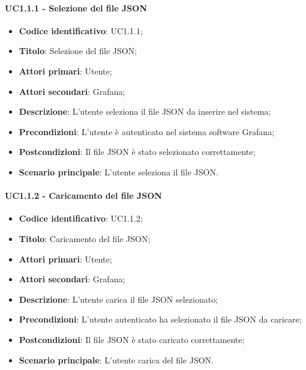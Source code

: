 \paragraph{UC1.1.1 - Selezione del file JSON}
\begin{itemize}
	\item \textbf{Codice identificativo}: UC1.1.1;
	\item \textbf{Titolo}: Selezione del file JSON;
	\item \textbf{Attori primari}: Utente;
	\item \textbf{Attori secondari}: Grafana\glo;
	\item \textbf{Descrizione}: L'utente seleziona il file JSON da inserire nel sistema;
	\item \textbf{Precondizioni}: L'utente è autenticato nel sistema software Grafana\glosp;
	\item \textbf{Postcondizioni}: Il file JSON è stato selezionato correttamente;
	\item \textbf{Scenario principale}: L'utente seleziona il file JSON.
\end{itemize}

\paragraph{UC1.1.2 - Caricamento del file JSON}
\begin{itemize}
	\item \textbf{Codice identificativo}: UC1.1.2;
	\item \textbf{Titolo}: Caricamento del file JSON;
	\item \textbf{Attori primari}: Utente;
	\item \textbf{Attori secondari}: Grafana\glo;
	\item \textbf{Descrizione}: L'utente carica il file JSON selezionato;
	\item \textbf{Precondizioni}: L'utente autenticato ha selezionato il file JSON da caricare;
	\item \textbf{Postcondizioni}: Il file JSON è stato caricato correttamente;
	\item \textbf{Scenario principale}: L'utente carica del file JSON.
\end{itemize}


